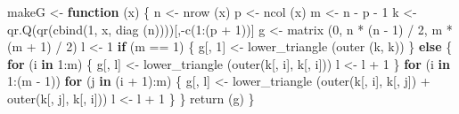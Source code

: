 \documentclass[
  12pt,
  letterpaper,
  DIV=11,
  numbers=noendperiod]{scrreprt}
\newenvironment{Shaded}{\begin{snugshade}}{\end{snugshade}}
\newcommand{\ControlFlowTok}[1]{\textcolor[rgb]{0.00,0.23,0.31}{\textbf{#1}}}
\newcommand{\DecValTok}[1]{\textcolor[rgb]{0.68,0.00,0.00}{#1}}
\newcommand{\FunctionTok}[1]{\textcolor[rgb]{0.28,0.35,0.67}{#1}}
\newcommand{\NormalTok}[1]{\textcolor[rgb]{0.00,0.23,0.31}{#1}}
\newcommand{\OtherTok}[1]{\textcolor[rgb]{0.00,0.23,0.31}{#1}}
\newcommand{\SpecialCharTok}[1]{\textcolor[rgb]{0.37,0.37,0.37}{#1}}
\theoremstyle{remark}
\begin{document}
\begin{Shaded}
\begin{Highlighting}[]
\NormalTok{makeG }\OtherTok{\textless{}{-}} \ControlFlowTok{function}\NormalTok{ (x) \{}
\NormalTok{  n }\OtherTok{\textless{}{-}} \FunctionTok{nrow}\NormalTok{ (x)}
\NormalTok{  p }\OtherTok{\textless{}{-}} \FunctionTok{ncol}\NormalTok{ (x)}
\NormalTok{  m }\OtherTok{\textless{}{-}}\NormalTok{ n }\SpecialCharTok{{-}}\NormalTok{ p }\SpecialCharTok{{-}} \DecValTok{1}
\NormalTok{  k }\OtherTok{\textless{}{-}} \FunctionTok{qr.Q}\NormalTok{(}\FunctionTok{qr}\NormalTok{(}\FunctionTok{cbind}\NormalTok{(}\DecValTok{1}\NormalTok{, x, }\FunctionTok{diag}\NormalTok{ (n))))[,}\SpecialCharTok{{-}}\FunctionTok{c}\NormalTok{(}\DecValTok{1}\SpecialCharTok{:}\NormalTok{(p }\SpecialCharTok{+} \DecValTok{1}\NormalTok{))]}
\NormalTok{  g }\OtherTok{\textless{}{-}} \FunctionTok{matrix}\NormalTok{ (}\DecValTok{0}\NormalTok{, n }\SpecialCharTok{*}\NormalTok{ (n }\SpecialCharTok{{-}} \DecValTok{1}\NormalTok{) }\SpecialCharTok{/} \DecValTok{2}\NormalTok{, m }\SpecialCharTok{*}\NormalTok{ (m }\SpecialCharTok{+} \DecValTok{1}\NormalTok{) }\SpecialCharTok{/} \DecValTok{2}\NormalTok{)}
\NormalTok{  l }\OtherTok{\textless{}{-}} \DecValTok{1}
  \ControlFlowTok{if}\NormalTok{ (m }\SpecialCharTok{==} \DecValTok{1}\NormalTok{) \{}
\NormalTok{    g[, }\DecValTok{1}\NormalTok{] }\OtherTok{\textless{}{-}} \FunctionTok{lower\_triangle}\NormalTok{ (}\FunctionTok{outer}\NormalTok{ (k, k))}
\NormalTok{  \}}
  \ControlFlowTok{else}\NormalTok{ \{}
    \ControlFlowTok{for}\NormalTok{ (i }\ControlFlowTok{in} \DecValTok{1}\SpecialCharTok{:}\NormalTok{m) \{}
\NormalTok{      g[, l] }\OtherTok{\textless{}{-}} \FunctionTok{lower\_triangle}\NormalTok{ (}\FunctionTok{outer}\NormalTok{(k[, i], k[, i]))}
\NormalTok{      l }\OtherTok{\textless{}{-}}\NormalTok{ l }\SpecialCharTok{+} \DecValTok{1}
\NormalTok{    \}}
    \ControlFlowTok{for}\NormalTok{ (i }\ControlFlowTok{in} \DecValTok{1}\SpecialCharTok{:}\NormalTok{(m }\SpecialCharTok{{-}} \DecValTok{1}\NormalTok{))}
      \ControlFlowTok{for}\NormalTok{ (j }\ControlFlowTok{in}\NormalTok{ (i }\SpecialCharTok{+} \DecValTok{1}\NormalTok{)}\SpecialCharTok{:}\NormalTok{m) \{}
\NormalTok{        g[, l] }\OtherTok{\textless{}{-}}
          \FunctionTok{lower\_triangle}\NormalTok{ (}\FunctionTok{outer}\NormalTok{(k[, i], k[, j]) }\SpecialCharTok{+} \FunctionTok{outer}\NormalTok{(k[, j], k[, i]))}
\NormalTok{        l }\OtherTok{\textless{}{-}}\NormalTok{ l }\SpecialCharTok{+} \DecValTok{1}
\NormalTok{      \}}
\NormalTok{  \}}
  \FunctionTok{return}\NormalTok{ (g)}
\NormalTok{\}}


\end{Highlighting}
\end{Shaded}
\end{document}
